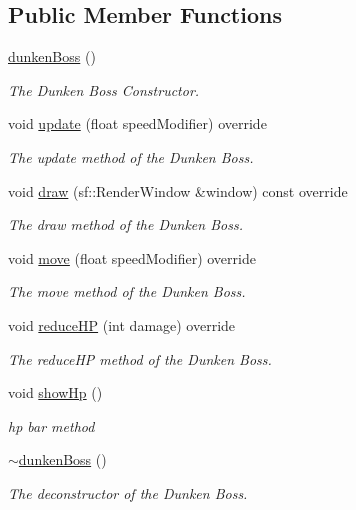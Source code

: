\subsection*{Public Member Functions}
\begin{DoxyCompactItemize}
\item 
\hyperlink{classdunken_boss_a66852d3fb008c3bbb3f62da434654336}{dunken\+Boss} ()
\begin{DoxyCompactList}\small\item\em The Dunken Boss Constructor. \end{DoxyCompactList}\item 
void \hyperlink{classdunken_boss_ad9ae91ab3ce0b97ee48ab90203c7e4fd}{update} (float speed\+Modifier) override
\begin{DoxyCompactList}\small\item\em The update method of the Dunken Boss. \end{DoxyCompactList}\item 
void \hyperlink{classdunken_boss_a5b2bf5b73f34e1970fd47985a2671f86}{draw} (sf\+::\+Render\+Window \&window) const override
\begin{DoxyCompactList}\small\item\em The draw method of the Dunken Boss. \end{DoxyCompactList}\item 
void \hyperlink{classdunken_boss_a298c2278b70343f32cc44ab0bb52ef77}{move} (float speed\+Modifier) override
\begin{DoxyCompactList}\small\item\em The move method of the Dunken Boss. \end{DoxyCompactList}\item 
void \hyperlink{classdunken_boss_a5bf9bfb79d92656ad08995cf0fca13f0}{reduce\+H\+P} (int damage) override
\begin{DoxyCompactList}\small\item\em The reduce\+H\+P method of the Dunken Boss. \end{DoxyCompactList}\item 
void \hyperlink{classdunken_boss_ad17c38732ddca5502bc07cbeee9bde44}{show\+Hp} ()
\begin{DoxyCompactList}\small\item\em hp bar method \end{DoxyCompactList}\item 
\hyperlink{classdunken_boss_a3644e5206cd4c4e3883febacd42191c5}{$\sim$dunken\+Boss} ()
\begin{DoxyCompactList}\small\item\em The deconstructor of the Dunken Boss. \end{DoxyCompactList}\end{DoxyCompactItemize}
